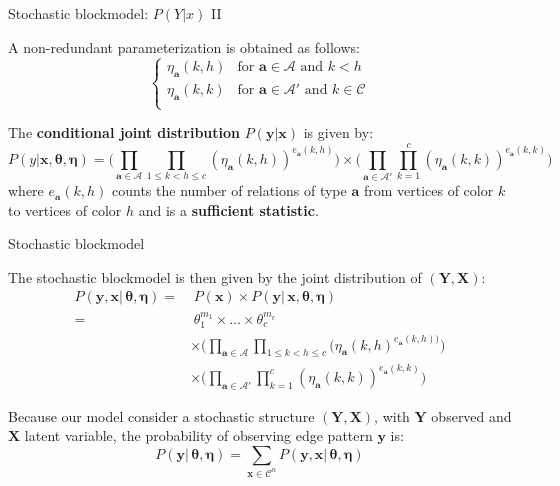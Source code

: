 \documentclass[aspectratio=169,xcolor=dvipsnames]{beamer}
\newcommand{\veca}{\boldsymbol{a}}
\newcommand{\seta}{\mathcal{A}}
\newcommand{\setc}{\mathcal{C}}
\newcommand{\vecx}{\textbf{x}}
\newcommand{\vecy}{\textbf{y}}
\newcommand{\matx}{\textbf{X}}
\newcommand{\maty}{\textbf{Y}}
\newcommand{\veceta}{\boldsymbol{\eta}}
\begin{document}
\begin{frame}{Stochastic blockmodel: $P(Y|x)$  II}

    A non-redundant parameterization is obtained as follows:
    $$
    \begin{cases}
      \eta_{\veca}(k,h) & \text{for }\veca\in\seta \text{ and } k<h \\
      \eta_{\veca}(k,k) & \text{for }\veca\in\seta'\text{ and } k \in \setc \\
   \end{cases}
    $$
    
    The \textbf{conditional joint distribution} $P(\vecy|\vecx)$ is given by:
    $$
    P(y|\vecx,\boldsymbol{\theta}, \veceta) =
    \Bigg( \prod_{\veca\in\seta}\prod_{1\leq k<h \leq c}(\eta_{\veca}(k,h))^{e_{\veca}(k, h)} \Bigg) \times
    \Bigg(\prod_{\veca\in\seta'}\prod_{k=1}^c(\eta_{\veca}(k,k))^{e_{\veca}(k, k)}\Bigg)
    $$
    where $e_{\veca}(k, h)$ counts the number of relations  of type $\veca$ from vertices of color $k$ to vertices of color $h$ and is a \textbf{sufficient statistic}.

\end{frame}
\begin{frame}{Stochastic blockmodel}

The stochastic blockmodel is then given by the joint distribution of $(\maty, \matx)$:
    \begin{align*}
        P(\vecy, \vecx|\,\boldsymbol{\theta}, \veceta) = &\hspace{3pt} P(\vecx)\times P(\vecy |\,\vecx, \boldsymbol{\theta}, \veceta) \\
        =& \hspace{3pt} \theta_1^{m_1}  \times \dots \times \theta_c^{m_c} \\
        &\times \Bigg(\prod_{\veca\in\seta}\prod_{1\leq k<h \leq c}(\eta_{\veca}(k,h)^{e_{\veca}(k, h))}\Bigg)\\
        &\times\Bigg(\prod_{\veca\in\seta'}\prod_{k=1}^c(\eta_{\veca}(k,k))^{e_{\veca}(k, k)}\Bigg)
    \end{align*}

    Because our model consider a stochastic structure $(\maty, \matx)$, with $\maty$ observed and $\matx$ latent variable, the probability of observing edge pattern $\vecy$ is:
    $$
    P(\vecy | \, \boldsymbol{\theta}, \veceta) = \sum_{\vecx \in \setc^n} P(\vecy, \vecx | \, \boldsymbol{\theta}, \veceta)
    $$


\end{frame}
\end{document}
